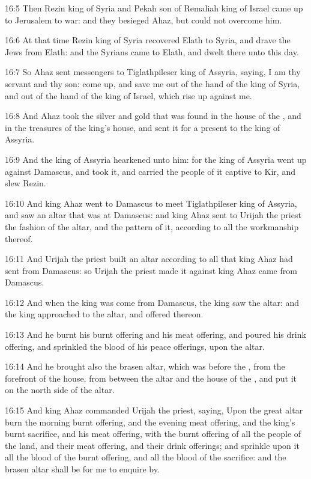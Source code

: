 16:5 Then Rezin king of Syria and Pekah son of Remaliah king of Israel
came up to Jerusalem to war: and they besieged Ahaz, but could not
overcome him.

16:6 At that time Rezin king of Syria recovered Elath to Syria, and
drave the Jews from Elath: and the Syrians came to Elath, and dwelt
there unto this day.

16:7 So Ahaz sent messengers to Tiglathpileser king of Assyria,
saying, I am thy servant and thy son: come up, and save me out of the
hand of the king of Syria, and out of the hand of the king of Israel,
which rise up against me.

16:8 And Ahaz took the silver and gold that was found in the house of
the \LORD, and in the treasures of the king's house, and sent it for a
present to the king of Assyria.

16:9 And the king of Assyria hearkened unto him: for the king of
Assyria went up against Damascus, and took it, and carried the people
of it captive to Kir, and slew Rezin.

16:10 And king Ahaz went to Damascus to meet Tiglathpileser king of
Assyria, and saw an altar that was at Damascus: and king Ahaz sent to
Urijah the priest the fashion of the altar, and the pattern of it,
according to all the workmanship thereof.

16:11 And Urijah the priest built an altar according to all that king
Ahaz had sent from Damascus: so Urijah the priest made it against king
Ahaz came from Damascus.

16:12 And when the king was come from Damascus, the king saw the
altar: and the king approached to the altar, and offered thereon.

16:13 And he burnt his burnt offering and his meat offering, and
poured his drink offering, and sprinkled the blood of his peace
offerings, upon the altar.

16:14 And he brought also the brasen altar, which was before the \LORD,
from the forefront of the house, from between the altar and the house
of the \LORD, and put it on the north side of the altar.

16:15 And king Ahaz commanded Urijah the priest, saying, Upon the
great altar burn the morning burnt offering, and the evening meat
offering, and the king's burnt sacrifice, and his meat offering, with
the burnt offering of all the people of the land, and their meat
offering, and their drink offerings; and sprinkle upon it all the
blood of the burnt offering, and all the blood of the sacrifice: and
the brasen altar shall be for me to enquire by.

